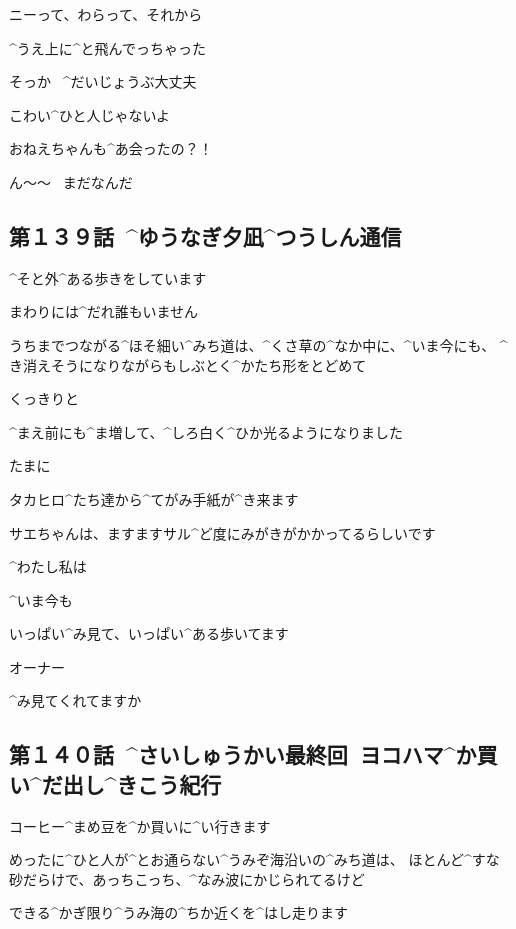 \Sae ニーって、わらって、それから

\Sae ^{うえ}{上}に^{と}{飛}んでっちゃった

\page[119]
\Makki そっか
\ ^{だいじょうぶ}{大丈夫}

\Makki こわい^{ひと}{人}じゃないよ

\page[120]
\Sae おねえちゃんも^{あ}{会}ったの？！

\Alpha ん〜〜
\ まだなんだ


\subsection{第１３９話\ ^{ゆうなぎ}{夕凪}^{つうしん}{通信}}

\page[123]
\Alpha ^{そと}{外}^{ある}{歩}きをしています

\Alpha まわりには^{だれ}{誰}もいません

\page[124]
\Alpha うちまでつながる^{ほそ}{細}い^{みち}{道}は、^{くさ}{草}の^{なか}{中}に、^{いま}{今}にも、
^{き}{消}えそうになりながらもしぶとく^{かたち}{形}をとどめて

\Alpha くっきりと

\Alpha ^{まえ}{前}にも^{ま}{増}して、^{しろ}{白}く^{ひか}{光}るようになりました

\page[125]
\Alpha たまに

\Alpha タカヒロ^{たち}{達}から^{てがみ}{手紙}が^{き}{来}ます

\Alpha サエちゃんは、ますますサル^{ど}{度}にみがきがかかってるらしいです

\page[135]
\Alpha ^{わたし}{私}は

\Alpha ^{いま}{今}も

\Alpha いっぱい^{み}{見}て、いっぱい^{ある}{歩}いてます

\page[136]
\Alpha オーナー

\Alpha ^{み}{見}てくれてますか


\subsection{第１４０話\ ^{さいしゅうかい}{最終回}\ ヨコハマ^{か}{買}い^{だ}{出}し^{きこう}{紀行}}

\page[140]
\Alpha コーヒー^{まめ}{豆}を^{か}{買}いに^{い}{行}きます

\Alpha めったに^{ひと}{人}が^{とお}{通}らない^{うみぞ}{海沿}いの^{みち}{道}は、
ほとんど^{すな}{砂}だらけで、あっちこっち、^{なみ}{波}にかじられてるけど

\Alpha できる^{かぎ}{限}り^{うみ}{海}の^{ちか}{近}くを^{はし}{走}ります


